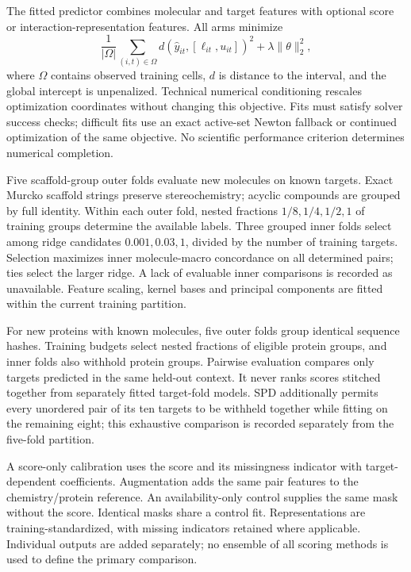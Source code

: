 \documentclass[pdflatex, sn-nature]{sn-jnl}
\begin{document}
The fitted predictor combines molecular and target features with optional score or interaction-representation features. All arms minimize
\begin{equation}
 \frac{1}{|\Omega|}\sum_{(i, t)\in\Omega} d\!\left(\widehat y_{it},[\ell_{it}, u_{it}]\right)^2+\lambda\|\theta\|_2^2,
 \label{eq:objective}
\end{equation}
where $\Omega$ contains observed training cells, $d$ is distance to the interval, and the global intercept is unpenalized. Technical numerical conditioning rescales optimization coordinates without changing this objective. Fits must satisfy solver success checks; difficult fits use an exact active-set Newton fallback or continued optimization of the same objective. No scientific performance criterion determines numerical completion.

Five scaffold-group outer folds evaluate new molecules on known targets. Exact Murcko scaffold strings preserve stereochemistry; acyclic compounds are grouped by full identity. Within each outer fold, nested fractions $1/8,1/4,1/2,1$ of training groups determine the available labels. Three grouped inner folds select among ridge candidates $0.001,0.03,1$, divided by the number of training targets. Selection maximizes inner molecule-macro concordance on all determined pairs; ties select the larger ridge. A lack of evaluable inner comparisons is recorded as unavailable. Feature scaling, kernel bases and principal components are fitted within the current training partition.

For new proteins with known molecules, five outer folds group identical sequence hashes. Training budgets select nested fractions of eligible protein groups, and inner folds also withhold protein groups. Pairwise evaluation compares only targets predicted in the same held-out context. It never ranks scores stitched together from separately fitted target-fold models. SPD additionally permits every unordered pair of its ten targets to be withheld together while fitting on the remaining eight; this exhaustive comparison is recorded separately from the five-fold partition.

A score-only calibration uses the score and its missingness indicator with target-dependent coefficients. Augmentation adds the same pair features to the chemistry/protein reference. An availability-only control supplies the same mask without the score. Identical masks share a control fit. Representations are training-standardized, with missing indicators retained where applicable. Individual outputs are added separately; no ensemble of all scoring methods is used to define the primary comparison.
\end{document}
